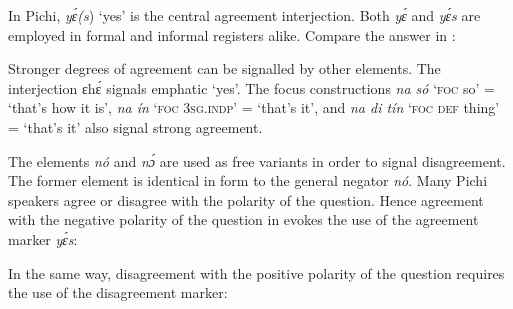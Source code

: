 In Pichi, \textit{yɛ́(s}) ‘yes’ is the central agreement interjection. Both \textit{yɛ́} and \textit{yɛ́s} are employed in formal and informal registers alike. Compare the answer in :


\ea%
    \label{ex:key:650}
\z
\z

Stronger degrees of agreement can be signalled by other elements. The interjection ɛhɛ́ signals emphatic ‘yes’. The focus constructions \textit{na só} ‘\textsc{foc} so’ = ‘that’s how it is’, \textit{na ín} ‘\textsc{foc 3sg.indp}’ = ‘that’s it’, and \textit{na di tín} ‘\textsc{foc def} thing’ = ‘that’s it’ also signal strong agreement. 


The elements \textit{nó} and \textit{nɔ́} are used as free variants in order to signal disagreement. The former element is identical in form to the general negator \textit{nó}. Many Pichi speakers agree or disagree with the polarity of the question. Hence agreement with the negative polarity of the question in  evokes the use of the agreement marker \textit{yɛ́s}:



\ea%
    \label{ex:key:651}
\z
\z

In the same way, disagreement with the positive polarity of the question requires the use of the disagreement marker: 


\ea%
    \label{ex:key:652}
\z
\z


